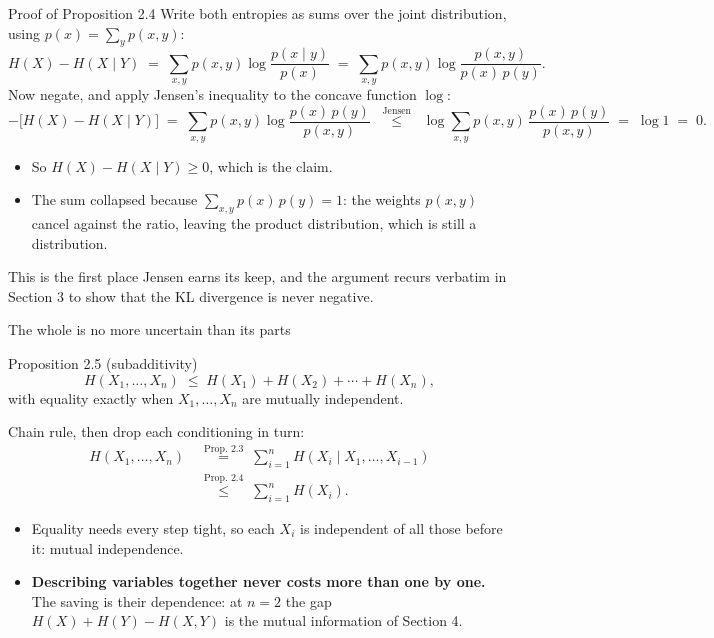 \documentclass[aspectratio=169,9pt]{beamer}
\newcommand{\orange}[1]{\textcolor{AmazonOrange}{\textbf{#1}}}
\newcommand{\muted}[1]{\textcolor{EPICMuted}{#1}}
\begin{document}
\begin{frame}{Proof of Proposition 2.4}
Write both entropies as sums over the joint distribution, using $p(x) = \sum_y p(x,y)$:
\vspace{-0.1cm}
\[
    H(X) - H(X \mid Y)
      \;=\; \sum_{x,y} p(x,y) \log \frac{p(x \mid y)}{p(x)}
      \;=\; \sum_{x,y} p(x,y) \log \frac{p(x,y)}{p(x)\,p(y)} .
\]
\pause
\vspace{-0.15cm}
Now negate, and apply Jensen's inequality to the concave function $\log$:
\vspace{-0.1cm}
\[
    -\big[H(X) - H(X \mid Y)\big]
      \;=\; \sum_{x,y} p(x,y) \log \frac{p(x)\,p(y)}{p(x,y)}
      \;\;\overset{\text{Jensen}}{\le}\;\;
      \log \sum_{x,y} p(x,y)\,\frac{p(x)\,p(y)}{p(x,y)}
      \;=\; \log 1 \;=\; 0 .
\]
\pause
\vspace{-0.1cm}
\begin{itemize}
    \item So $H(X) - H(X \mid Y) \ge 0$, which is the claim.
    \pause
    \item \muted{The sum collapsed because $\sum_{x,y} p(x)\,p(y) = 1$: the weights $p(x,y)$ cancel against
    the ratio, leaving the product distribution, which is still a distribution.}
\end{itemize}
\vspace{0.15cm}
\pause
\muted{This is the first place Jensen earns its keep, and the argument recurs verbatim in Section 3 to show
that the KL divergence is never negative.}
\end{frame}

\begin{frame}{The whole is no more uncertain than its parts}
\begin{block}{Proposition 2.5 (subadditivity)}
\[
    H(X_1, \dots, X_n) \;\le\; H(X_1) + H(X_2) + \cdots + H(X_n),
\]
with equality exactly when $X_1, \dots, X_n$ are mutually independent.
\end{block}
\pause
Chain rule, then drop each conditioning in turn:
\vspace{-0.15cm}
\begin{align*}
    H(X_1, \dots, X_n) &\;\overset{\text{Prop. }2.3}{=}\; \sum_{i=1}^n H(X_i \mid X_1, \dots, X_{i-1}) \\[0.05cm]
                       &\;\overset{\text{Prop. }2.4}{\le}\; \sum_{i=1}^n H(X_i) .
\end{align*}
\pause
\vspace{-0.28cm}
\begin{itemize}
    \item Equality needs every step tight, so each $X_i$ is independent of all those before it: mutual
    independence.
    \pause
    \item \orange{Describing variables together never costs more than one by one.} The saving is their
    dependence: at $n = 2$ the gap $H(X) + H(Y) - H(X,Y)$ is the mutual information of Section 4.
\end{itemize}
\end{frame}
\end{document}
